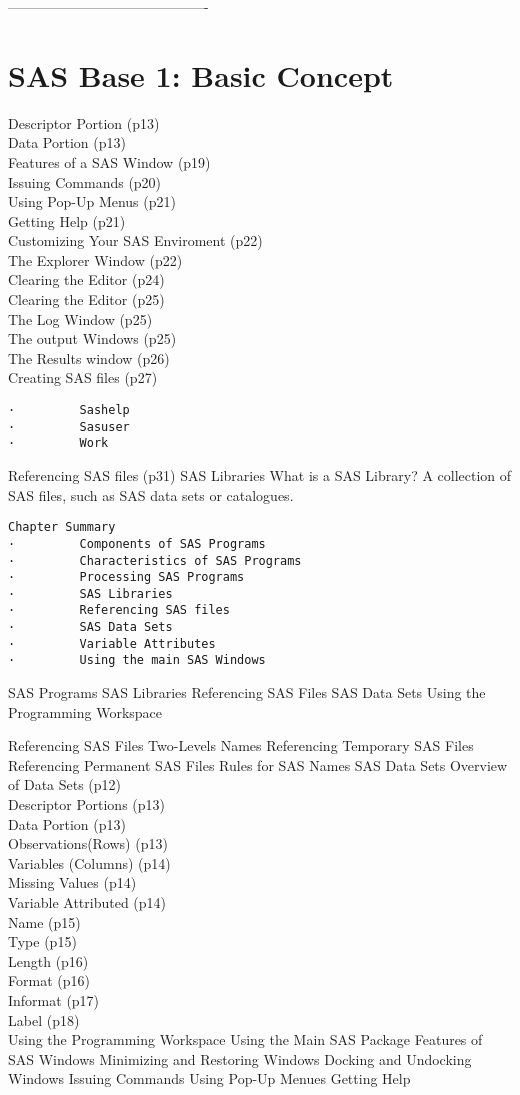 -------------------------------------------%
\section{SAS Base 1: Basic Concept}
Descriptor Portion (p13)\\
Data Portion (p13)\\
Features of a SAS Window (p19)\\
Issuing Commands (p20)\\
Using Pop-Up Menus (p21)\\
Getting Help (p21)\\
Customizing Your SAS Enviroment (p22)\\
The Explorer Window (p22)\\
Clearing the Editor (p24)\\
Clearing the Editor (p25)\\
The Log Window (p25)\\
The output Windows (p25)\\
The Results window (p26)\\

Creating SAS files (p27)
\begin{verbatim}
·         Sashelp
·         Sasuser
·         Work
\end{verbatim}
Referencing SAS files (p31)
SAS Libraries
What is a SAS Library? A collection of SAS files, such as SAS data sets or catalogues.

\begin{verbatim}
Chapter Summary
·         Components of SAS Programs
·         Characteristics of SAS Programs
·         Processing SAS Programs
·         SAS Libraries
·         Referencing SAS files
·         SAS Data Sets
·         Variable Attributes
·         Using the main SAS Windows
\end{verbatim}




SAS Programs
SAS Libraries
Referencing SAS Files
SAS Data Sets
Using the Programming Workspace

Referencing SAS Files
Two-Levels Names
Referencing Temporary SAS Files
Referencing Permanent SAS Files
Rules for SAS Names
SAS Data Sets
Overview of Data Sets (p12)\\
Descriptor Portions (p13)\\
Data Portion (p13)\\
Observations(Rows) (p13)\\
Variables (Columns) (p14)\\
Missing Values (p14)\\
Variable Attributed (p14)\\
Name (p15)\\
Type (p15)\\
Length (p16)\\
Format (p16)\\
Informat (p17)\\
Label (p18)\\

Using the Programming Workspace
Using the Main SAS Package
Features of SAS Windows
Minimizing and Restoring Windows
Docking and Undocking Windows
Issuing Commands
Using Pop-Up Menues
Getting Help
